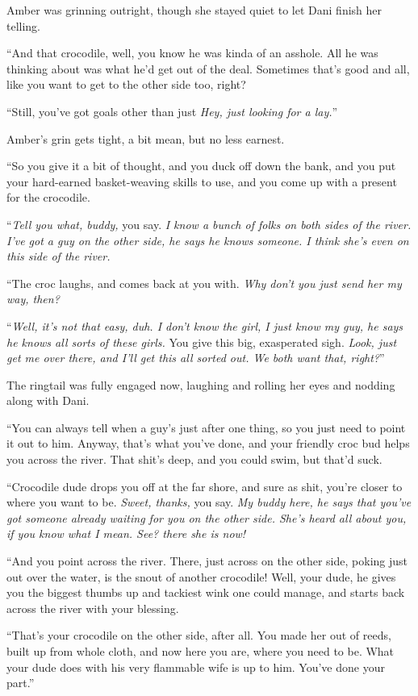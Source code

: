 Amber was grinning outright, though she stayed quiet to let Dani finish her telling.

``And that crocodile, well, you know he was kinda of an asshole. All he was thinking about was what he'd get out of the deal. Sometimes that's good and all, like you want to get to the other side too, right?

``Still, you've got goals other than just \emph{Hey, just looking for a lay.}''

Amber's grin gets tight, a bit mean, but no less earnest.

``So you give it a bit of thought, and you duck off down the bank, and you put your hard-earned basket-weaving skills to use, and you come up with a present for the crocodile.

``\emph{Tell you what, buddy,} you say. \emph{I know a bunch of folks on both sides of the river. I've got a guy on the other side, he says he knows someone. I think she's even on this side of the river.}

``The croc laughs, and comes back at you with. \emph{Why don't you just send her my way, then?}

``\emph{Well, it's not that easy, duh. I don't know the girl, I just know my guy, he says he knows all sorts of these girls.} You give this big, exasperated sigh. \emph{Look, just get me over there, and I'll get this all sorted out. We both want that, right?}''

The ringtail was fully engaged now, laughing and rolling her eyes and nodding along with Dani.

``You can always tell when a guy's just after one thing, so you just need to point it out to him. Anyway, that's what you've done, and your friendly croc bud helps you across the river. That shit's deep, and you could swim, but that'd suck.

``Crocodile dude drops you off at the far shore, and sure as shit, you're closer to where you want to be. \emph{Sweet, thanks,} you say. \emph{My buddy here, he says that you've got someone already waiting for you on the other side. She's heard all about you, if you know what I mean. See? there she is now!}

``And you point across the river. There, just across on the other side, poking just out over the water, is the snout of another crocodile! Well, your dude, he gives you the biggest thumbs up and tackiest wink one could manage, and starts back across the river with your blessing.

``That's your crocodile on the other side, after all. You made her out of reeds, built up from whole cloth, and now here you are, where you need to be. What your dude does with his very flammable wife is up to him. You've done your part.''

